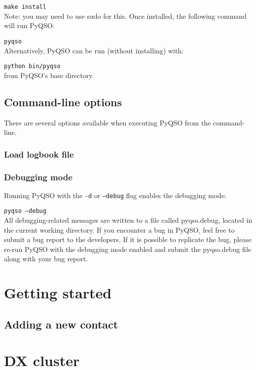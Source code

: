 \documentclass[11pt, a4paper]{report}
\begin{document}
  \texttt{make install}\\
Note: you may need to use sudo for this. Once installed, the following command will run PyQSO:

  \texttt{pyqso}\\
Alternatively, PyQSO can be run (without installing) with:

  \texttt{python bin/pyqso}\\
from PyQSO's base directory.

\section{Command-line options}
There are several options available when executing PyQSO from the command-line.

\subsection{Load logbook file}

\subsection{Debugging mode}
Running PyQSO with the \texttt{-d} or \texttt{--debug} flag enables the debugging mode:

  \texttt{pyqso --debug}\\
All debugging-related messages are written to a file called pyqso.debug, located in the current working directory. If you encounter a bug in PyQSO, feel free to submit a bug report to the developers. If it is possible to replicate the bug, please re-run PyQSO with the debugging mode enabled and submit the pyqso.debug file along with your bug report.

\chapter{Getting started}


\section{Adding a new contact}


\chapter{DX cluster}




\end{document}
